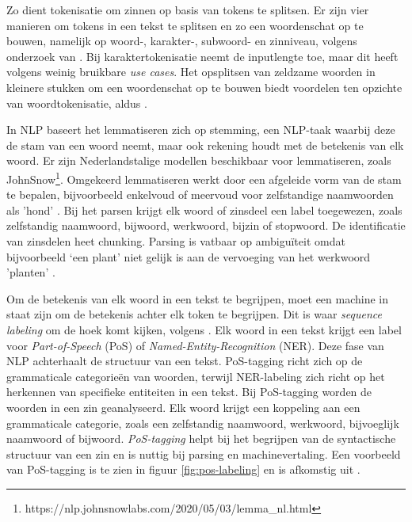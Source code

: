 \medspace

Zo dient tokenisatie om zinnen op basis van tokens te splitsen. Er zijn vier manieren om tokens in een tekst te splitsen en zo een woordenschat op te bouwen, namelijk op woord-, karakter-, subwoord- en zinniveau, volgens onderzoek van \textcite{Menzli2023}. Bij karaktertokenisatie neemt de inputlengte toe, maar dit heeft volgens \textcite{Ribeiro2018} weinig bruikbare \textit{use cases}. Het opsplitsen van zeldzame woorden in kleinere stukken om een woordenschat op te bouwen biedt voordelen ten opzichte van woordtokenisatie, aldus \autocite{Iredale2022}.

\medspace

In NLP baseert het lemmatiseren zich op stemming, een NLP-taak waarbij deze de stam van een woord neemt, maar ook rekening houdt met de betekenis van elk woord. Er zijn Nederlandstalige modellen beschikbaar voor lemmatiseren, zoals JohnSnow\footnote{https://nlp.johnsnowlabs.com/2020/05/03/lemma\_nl.html}. Omgekeerd lemmatiseren werkt door een afgeleide vorm van de stam te bepalen, bijvoorbeeld enkelvoud of meervoud voor zelfstandige naamwoorden als ’hond’ \autocite{Eisenstein2019}. Bij het parsen krijgt elk woord of zinsdeel een label toegewezen, zoals zelfstandig naamwoord, bijwoord, werkwoord, bijzin of stopwoord. De identificatie van zinsdelen heet chunking. Parsing is vatbaar op ambiguïteit omdat bijvoorbeeld ‘een plant’ niet gelijk is aan de vervoeging van het werkwoord ’planten’ \autocite{Eisenstein2019}.

\medspace

Om de betekenis van elk woord in een tekst te begrijpen, moet een machine in staat zijn om de betekenis achter elk token te begrijpen. Dit is waar \textit{sequence labeling} om de hoek komt kijken, volgens \textcite{Eisenstein2019}. Elk woord in een tekst krijgt een label voor \textit{Part-of-Speech} (PoS) of \textit{Named-Entity-Recognition} (NER). Deze fase van NLP achterhaalt de structuur van een tekst. PoS-tagging richt zich op de grammaticale categorieën van woorden, terwijl NER-labeling zich richt op het herkennen van specifieke entiteiten in een tekst. Bij PoS-tagging worden de woorden in een zin geanalyseerd. Elk woord krijgt een koppeling aan een grammaticale categorie, zoals een zelfstandig naamwoord, werkwoord, bijvoeglijk naamwoord of bijwoord. \textit{PoS-tagging} helpt bij het begrijpen van de syntactische structuur van een zin en is nuttig bij parsing en machinevertaling. Een voorbeeld van PoS-tagging is te zien in figuur \ref{fig:pos-labeling} en is afkomstig uit \textcite{Bilisci2021}.

